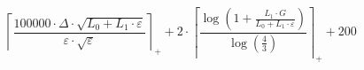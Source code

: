 \[\left\lceil \frac{100000 \cdot \Delta \cdot \sqrt{L_0 + L_1 \cdot \varepsilon}}{\varepsilon \cdot \sqrt{\varepsilon}} \right\rceil_{+} + 2 \cdot \left\lceil \frac{\log\left(1 + \frac{L_1 \cdot G}{L_0 + L_1 \cdot \varepsilon}\right)}{\log\left(\frac{4}{3}\right)} \right\rceil_{+} + 200\]
